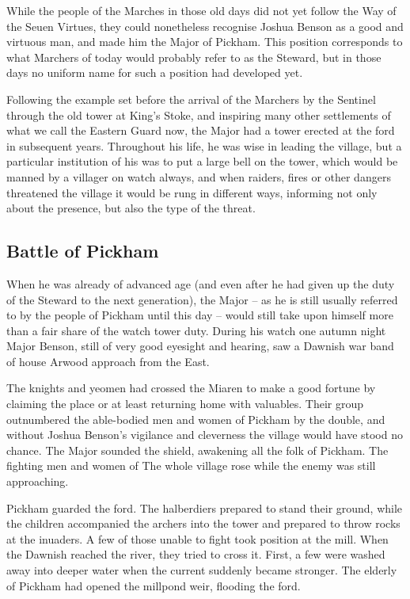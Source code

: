 While the people
of the Marches in those old days did
not yet follow the Way of the Seuen
Virtues, they could nonetheless
recognise Joshua Benson as a good
and virtuous man, and made him
the Major of Pickham. This position
corresponds to what Marchers of
today would probably refer to as the
Steward, but in those days no
uniform name for such a position had
developed yet.

Following the example
set before the arrival of the Marchers
by the Sentinel through the old tower at King's Stoke, and
inspiring many other settlements of
what we call the Eastern Guard
now, the Major had a tower erected
at the ford in subsequent years.
Throughout his life, he was wise
in leading the village, but a
particular institution of his was to
put a large bell on the tower, which
would be manned by a villager on
watch always, and when raiders,
fires or other dangers threatened the
village it would be rung in
different ways, informing not only
about the presence, but also the type
of the threat.

\subsection{Battle of Pickham}
When he was already of
advanced age (and even
after he had given up the
duty of the Steward to the next generation), the
Major – as he is still usually referred
to by the people of Pickham until
this day – would still take upon
himself more than a fair share of the
watch tower duty. During his
watch one autumn night Major
Benson, still of very good eyesight
and hearing, saw a Dawnish war
band of house Arwood approach
from the East.

The knights and
yeomen had crossed the Miaren to
make a good fortune by claiming the
place or at least returning home
with valuables. Their group
outnumbered the able-bodied men
and women of Pickham by the
double, and without Joshua
Benson's vigilance and cleverness
the village would have stood no
chance. The Major sounded the shield,
awakening all the folk of Pickham.
The fighting men and women of 
The whole village rose while
the enemy was still approaching.

Pickham guarded the ford. The
halberdiers prepared to stand their 
ground, while the children
accompanied the archers into the
tower and prepared to throw rocks 
at the inuaders. A few of those
unable to fight took position at the
mill. When the Dawnish
reached the river, they tried to cross
it. First, a few were washed away 
into deeper water when the current 
suddenly became stronger. The
elderly of Pickham had opened the
millpond weir, flooding the ford.

